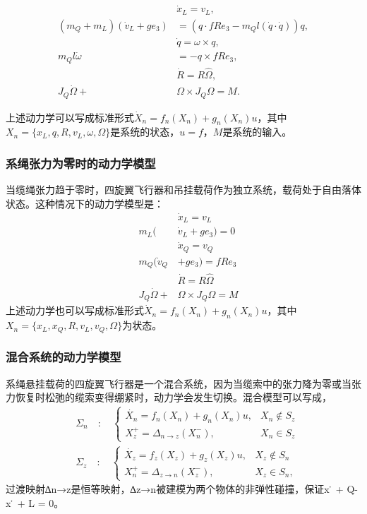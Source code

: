 \documentclass[lang=chs, degree=master, blindreview=false, winfonts=true]{yanputhesis}
\begin{document}
\begin{equation}
	\begin{aligned}
		&\dot{x}_{L}=v_{L}, \\
		(m_Q+m_L)(\dot{v}_L+ge_3)& =(q\cdot fRe_3-m_Ql(\dot{q}\cdot\dot{q}))q, \\
		&\dot{q}=\omega\times q, \\
		m_{Q}l \dot{\omega}&=-q\times fRe_{3}, \\
		&\dot{R}=R\hat{\Omega}, \\
		J_{Q}\dot{\Omega}+&\Omega\times J_{Q}\Omega=M.
	\end{aligned}
\end{equation}

上述动力学可以写成标准形式$\dot{X}_n=f_n(X_n)+g_n(X_n)u$，其中$X_n = \{x_L,q,R,v_L,\omega,\Omega\}$是系统的状态，$u = { f，M }$是系统的输入。
\subsubsection{系绳张力为零时的动力学模型}
当缆绳张力趋于零时，四旋翼飞行器和吊挂载荷作为独立系统，载荷处于自由落体状态。这种情况下的动力学模型是：
\begin{equation}
	\begin{aligned}
		&\dot{x}_{L}=v_{L}\\
		\quad m_{L}(&\dot{v}_{L}+ge_{3})=0\\
		&\dot{x}_{Q}=v_{Q}\\
		\quad m_{Q}(\dot{v}_{Q}&+ge_{3})=fRe_{3}\\
		&\dot{R}=R\hat{\Omega}\\
		\quad J_{Q}\dot{\Omega}+&\Omega\times J_{Q}\Omega=M
	\end{aligned}
\end{equation}
上述动力学也可以写成标准形式$\dot{X}_n=f_n(X_n)+g_n(X_n)u$，其中$X_n=\{x_L,x_Q,R,v_L,v_Q,\Omega\}$为状态。

\subsubsection{混合系统的动力学模型}
系绳悬挂载荷的四旋翼飞行器是一个混合系统，因为当缆索中的张力降为零或当张力恢复时松弛的缆索变得绷紧时，动力学会发生切换。混合模型可以写成，
\begin{equation}
	\left.\begin{aligned}&\Sigma_{n}\quad:\quad\left\{\begin{array}{ll}\dot{X_n}=f_n(X_n)+g_n(X_n)u,&X_n\notin S_z\\X_z^+=\Delta_{n\to z}(X_n^-),&X_n\in S_z\end{array}\right.\\&\Sigma_{z}\quad:\quad\left\{\begin{array}{ll}\dot{X_z}=f_z(X_z)+g_z(X_z)u,&X_z\notin S_n\\X_n^+=\Delta_{z\to n}(X_z^-),&X_z\in S_n,\end{array}\right.\end{aligned}\right.
\end{equation}
过渡映射∆n→z是恒等映射，∆z→n被建模为两个物体的非弹性碰撞，保证x ̇ + Q-x ̇ + L = 0。
\end{document}
